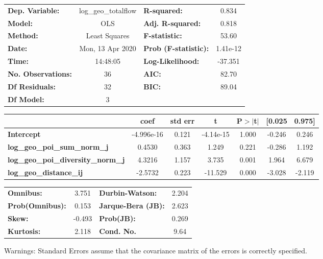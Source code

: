 \begin{center}
\begin{tabular}{lclc}
\toprule
\textbf{Dep. Variable:}                    & log\_geo\_totalflow & \textbf{  R-squared:         } &     0.834   \\
\textbf{Model:}                            &         OLS         & \textbf{  Adj. R-squared:    } &     0.818   \\
\textbf{Method:}                           &    Least Squares    & \textbf{  F-statistic:       } &     53.60   \\
\textbf{Date:}                             &   Mon, 13 Apr 2020  & \textbf{  Prob (F-statistic):} &  1.41e-12   \\
\textbf{Time:}                             &       14:48:05      & \textbf{  Log-Likelihood:    } &   -37.351   \\
\textbf{No. Observations:}                 &            36       & \textbf{  AIC:               } &     82.70   \\
\textbf{Df Residuals:}                     &            32       & \textbf{  BIC:               } &     89.04   \\
\textbf{Df Model:}                         &             3       & \textbf{                     } &             \\
\bottomrule
\end{tabular}
\begin{tabular}{lcccccc}
                                           & \textbf{coef} & \textbf{std err} & \textbf{t} & \textbf{P$> |$t$|$} & \textbf{[0.025} & \textbf{0.975]}  \\
\midrule
\textbf{Intercept}                         &   -4.996e-16  &        0.121     & -4.14e-15  &         1.000        &       -0.246    &        0.246     \\
\textbf{log\_geo\_poi\_sum\_norm\_j}       &       0.4530  &        0.363     &     1.249  &         0.221        &       -0.286    &        1.192     \\
\textbf{log\_geo\_poi\_diversity\_norm\_j} &       4.3216  &        1.157     &     3.735  &         0.001        &        1.964    &        6.679     \\
\textbf{log\_geo\_distance\_ij}            &      -2.5732  &        0.223     &   -11.529  &         0.000        &       -3.028    &       -2.119     \\
\bottomrule
\end{tabular}
\begin{tabular}{lclc}
\textbf{Omnibus:}       &  3.751 & \textbf{  Durbin-Watson:     } &    2.204  \\
\textbf{Prob(Omnibus):} &  0.153 & \textbf{  Jarque-Bera (JB):  } &    2.623  \\
\textbf{Skew:}          & -0.493 & \textbf{  Prob(JB):          } &    0.269  \\
\textbf{Kurtosis:}      &  2.118 & \textbf{  Cond. No.          } &     9.64  \\
\bottomrule
\end{tabular}
\end{center}

Warnings: \newline
 [1] Standard Errors assume that the covariance matrix of the errors is correctly specified.